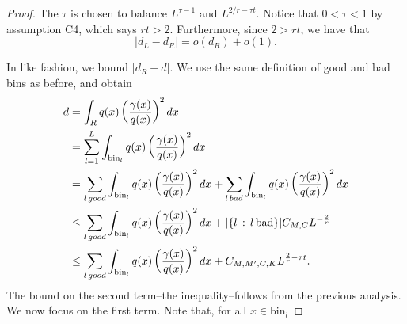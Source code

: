 \documentclass{article}
\newcommand{\bin}{\text{bin}}
\begin{document}
\begin{proof}
The $\tau$ is chosen to balance $L^{\tau - 1}$ and $L^{2/r - \tau t}$. Notice that $0 < \tau < 1$ by assumption C4, which says $rt > 2$. Furthermore, since $2 > rt$, we have that $$|d_L - d_R| = o(d_R) + o(1).$$

In like fashion, we bound $| d_R - d|$. We use the same definition of good and bad bins as before, and obtain 
\begin{align*}
d &= \int_R q(x) \left( \frac{\gamma(x)}{q(x)} \right)^2 dx \\
  &= \sum_{l=1}^L \int_{\bin_l} q(x) \left( \frac{\gamma(x)}{q(x)} \right)^2 dx \\
  &= \sum_{l \, good} \int_{\bin_l} q(x) \left( \frac{\gamma(x)}{q(x)} \right)^2 dx +
     \sum_{l \, bad} \int_{\bin_l}  q(x) \left( \frac{\gamma(x)}{q(x)} \right)^2 dx \\
  &\leq \sum_{l\, good} \int_{\bin_l}  q(x) \left( \frac{\gamma(x)}{q(x)} \right)^2 dx +
        |\{ l \,:\, l \, \trm{bad}\}| C_{M,C} L^{-\frac{2}{r}} \\
 & \leq \sum_{l\, good} \int_{\bin_l}  q(x) \left( \frac{\gamma(x)}{q(x)} \right)^2 dx +
        C_{M,M',C,K} L^{\frac{2}{r} - \tau t}. 
\end{align*}
The bound on the second term--the inequality--follows from the previous analysis. We now focus on the first term. Note that, for all $x \in \bin_l$


\end{proof}
\end{document}
